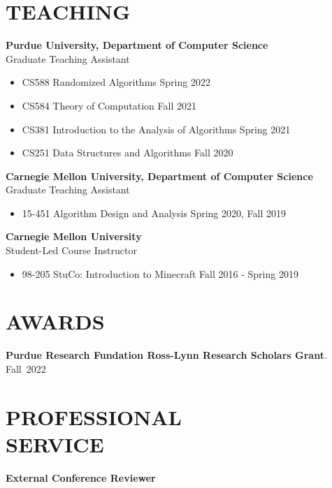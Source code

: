 \documentclass[margin, 10pt]{res} %
\begin{document}
\begin{resume}
\section{TEACHING}

{\bf Purdue University, Department of Computer Science}\\
Graduate Teaching Assistant

\begin{itemize}
\item CS588 Randomized Algorithms \hfill Spring 2022
\item CS584 Theory of Computation \hfill Fall 2021
\item CS381 Introduction to the Analysis of Algorithms \hfill Spring 2021
\item CS251 Data Structures and Algorithms \hfill Fall 2020
\end{itemize}
{\bf Carnegie Mellon University, Department of Computer Science}\\
Graduate Teaching Assistant

\begin{itemize}
\item 15-451 Algorithm Design and Analysis \hfill Spring 2020, Fall 2019
\end{itemize}

{\bf Carnegie Mellon University}\\
Student-Led Course Instructor

\begin{itemize}
\item 98-205 StuCo: Introduction to Minecraft \hfill Fall 2016 - Spring 2019
\end{itemize}

\section{AWARDS}
{\bf Purdue Research Fundation Ross-Lynn Research Scholars Grant}. \hfill Fall~2022

\section{PROFESSIONAL \\ SERVICE}

{\bf External Conference Reviewer}


\end{resume}
\end{document}
